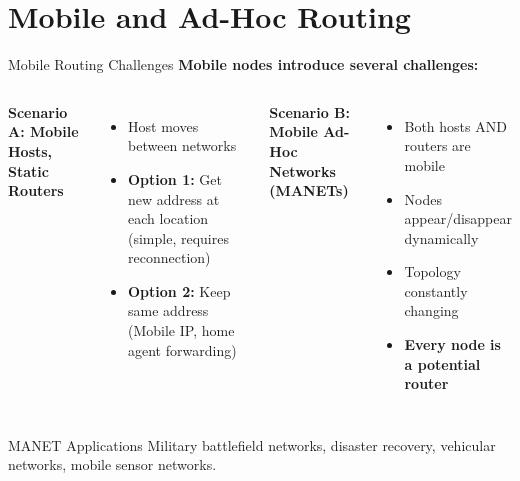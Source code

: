 \documentclass[aspectratio=169,11pt]{beamer}
\begin{document}
\section{Mobile and Ad-Hoc Routing}

\begin{frame}{Mobile Routing Challenges}
    \textbf{Mobile nodes introduce several challenges:}
    
    \vspace{0.3cm}
    \begin{columns}
        \textbf{Scenario A: Mobile Hosts, Static Routers}
        \begin{itemize}
            \item Host moves between networks
            \item \textbf{Option 1:} Get new address at each location (simple, requires reconnection)
            \item \textbf{Option 2:} Keep same address (Mobile IP, home agent forwarding)
        \end{itemize}
        
        \textbf{Scenario B: Mobile Ad-Hoc Networks (MANETs)}
        \begin{itemize}
            \item Both hosts AND routers are mobile
            \item Nodes appear/disappear dynamically
            \item Topology constantly changing
            \item \textbf{Every node is a potential router}
        \end{itemize}
    \end{columns}
    
    \vspace{0.3cm}
    \begin{exampleblock}{MANET Applications}
        Military battlefield networks, disaster recovery, vehicular networks, mobile sensor networks.
    \end{exampleblock}
\end{frame}
\end{document}
